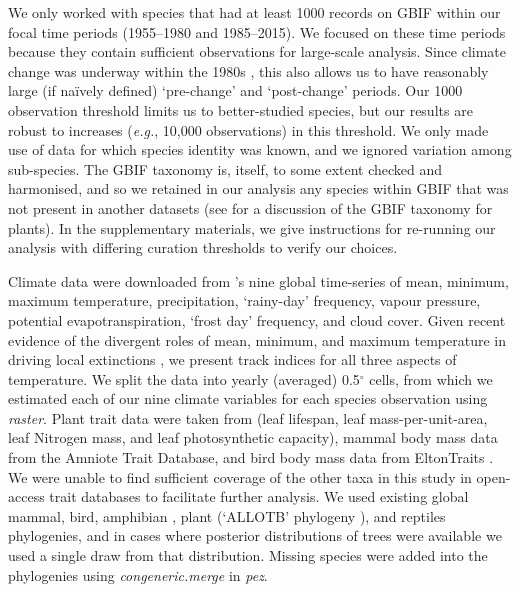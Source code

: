 \documentclass[12pt]{report}
\begin{document}
We only worked with species that had at least 1000 records on GBIF
within our focal time periods (1955--1980 and 1985--2015). We focused
on these time periods because they contain sufficient observations for
large-scale analysis. Since climate change was underway within the
1980s \supercite{IPCC2014}, this also allows us to have reasonably
large (if na\"{i}vely defined) `pre-change' and `post-change'
periods. Our 1000 observation threshold limits us to better-studied
species, but our results are robust to increases (\emph{e.g.}, 10,000
observations) in this threshold. We only made use of data for which
species identity was known, and we ignored variation among
sub-species. The GBIF taxonomy is, itself, to some extent checked and
harmonised, and so we retained in our analysis any species within GBIF
that was not present in another datasets (see
\citeauthor{Cornwell2019}\supercite{Cornwell2019} for a discussion of
the GBIF taxonomy for plants). In the supplementary materials, we give
instructions for re-running our analysis with differing curation
thresholds to verify our choices.

Climate data were downloaded from
\citeauthor{Harris2014}\supercite{Harris2014}'s nine global
time-series of mean, minimum, maximum temperature, precipitation,
`rainy-day' frequency, vapour pressure, potential evapotranspiration,
`frost day' frequency, and cloud cover. Given recent evidence of the
divergent roles of mean, minimum, and maximum temperature in driving
local extinctions \supercite{Roman-Palacios2020}, we present track
indices for all three aspects of temperature. We split the data into
yearly (averaged) 0.5$^\circ$ cells, from which we estimated each of
our nine climate variables for each species observation using
\emph{raster}\supercite{Hijmans2019}. Plant trait data were taken from
\citeauthor{Wright2004}\supercite{Wright2004} (leaf lifespan, leaf
mass-per-unit-area, leaf Nitrogen mass, and leaf photosynthetic
capacity), mammal body mass data from the Amniote Trait
Database\supercite{Myhrvold2015}, and bird body mass data from
EltonTraits \supercite{Wilman2014}. We were unable to find sufficient
coverage of the other taxa in this study in open-access trait
databases to facilitate further analysis. We used existing global
mammal\supercite{Faurby2015}, bird\supercite{Jetz2012}, amphibian
\supercite{Jetz2018}, plant (`ALLOTB' phylogeny
\supercite{Smith2018}), and reptiles\supercite{Zheng2016} phylogenies,
and in cases where posterior distributions of trees were available we
used a single draw from that distribution. Missing species were added
into the phylogenies using \emph{congeneric.merge} in
\emph{pez}\supercite{Pearse2015}.
\end{document}
